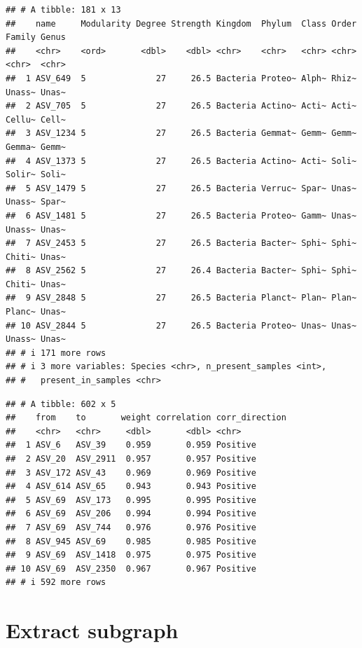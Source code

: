 \documentclass[
]{book}
\newenvironment{Shaded}{\begin{snugshade}}{\end{snugshade}}
\newcommand{\CommentTok}[1]{\textcolor[rgb]{0.56,0.35,0.01}{\textit{#1}}}
\newcommand{\NormalTok}[1]{#1}
\newcommand{\SpecialCharTok}[1]{\textcolor[rgb]{0.81,0.36,0.00}{\textbf{#1}}}
\begin{document}
\begin{verbatim}
## # A tibble: 181 x 13
##    name     Modularity Degree Strength Kingdom  Phylum  Class Order Family Genus
##    <chr>    <ord>       <dbl>    <dbl> <chr>    <chr>   <chr> <chr> <chr>  <chr>
##  1 ASV_649  5              27     26.5 Bacteria Proteo~ Alph~ Rhiz~ Unass~ Unas~
##  2 ASV_705  5              27     26.5 Bacteria Actino~ Acti~ Acti~ Cellu~ Cell~
##  3 ASV_1234 5              27     26.5 Bacteria Gemmat~ Gemm~ Gemm~ Gemma~ Gemm~
##  4 ASV_1373 5              27     26.5 Bacteria Actino~ Acti~ Soli~ Solir~ Soli~
##  5 ASV_1479 5              27     26.5 Bacteria Verruc~ Spar~ Unas~ Unass~ Spar~
##  6 ASV_1481 5              27     26.5 Bacteria Proteo~ Gamm~ Unas~ Unass~ Unas~
##  7 ASV_2453 5              27     26.5 Bacteria Bacter~ Sphi~ Sphi~ Chiti~ Unas~
##  8 ASV_2562 5              27     26.4 Bacteria Bacter~ Sphi~ Sphi~ Chiti~ Unas~
##  9 ASV_2848 5              27     26.5 Bacteria Planct~ Plan~ Plan~ Planc~ Unas~
## 10 ASV_2844 5              27     26.5 Bacteria Proteo~ Unas~ Unas~ Unass~ Unas~
## # i 171 more rows
## # i 3 more variables: Species <chr>, n_present_samples <int>,
## #   present_in_samples <chr>
\end{verbatim}

\begin{Shaded}
\end{Shaded}

\begin{verbatim}
## # A tibble: 602 x 5
##    from    to       weight correlation corr_direction
##    <chr>   <chr>     <dbl>       <dbl> <chr>         
##  1 ASV_6   ASV_39    0.959       0.959 Positive      
##  2 ASV_20  ASV_2911  0.957       0.957 Positive      
##  3 ASV_172 ASV_43    0.969       0.969 Positive      
##  4 ASV_614 ASV_65    0.943       0.943 Positive      
##  5 ASV_69  ASV_173   0.995       0.995 Positive      
##  6 ASV_69  ASV_206   0.994       0.994 Positive      
##  7 ASV_69  ASV_744   0.976       0.976 Positive      
##  8 ASV_945 ASV_69    0.985       0.985 Positive      
##  9 ASV_69  ASV_1418  0.975       0.975 Positive      
## 10 ASV_69  ASV_2350  0.967       0.967 Positive      
## # i 592 more rows
\end{verbatim}

\chapter{Extract subgraph}\label{extract-subgraph}
\end{document}
